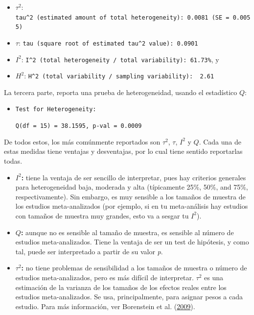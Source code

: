 \documentclass[
  bookmarksnumbered]{article}
\begin{document}
\begin{itemize}
\item
  \(\tau^2\): \texttt{tau\^{}2\ (estimated\ amount\ of\ total\ heterogeneity):\ 0.0081\ (SE\ =\ 0.0055)}
\item
  \(\tau\): \texttt{tau\ (square\ root\ of\ estimated\ tau\^{}2\ value):\ 0.0901}
\item
  \(I^2\): \texttt{I\^{}2\ (total\ heterogeneity\ /\ total\ variability):\ 61.73\%}, y
\item
  \(H^2\): \texttt{H\^{}2\ (total\ variability\ /\ sampling\ variability):\ \ 2.61}
\end{itemize}

La tercera parte, reporta una prueba de heterogeneidad, usando el estadístico \(Q\):

\begin{itemize}
\item
  \texttt{Test\ for\ Heterogeneity:}

  \texttt{Q(df\ =\ 15)\ =\ 38.1595,\ p-val\ =\ 0.0009}
\end{itemize}

De todos estos, los más comúnmente reportados son \(\tau^2\), \(\tau\), \(I^2\) y \(Q\). Cada una de estas medidas tiene ventajas y desventajas, por lo cual tiene sentido reportarlas todas.

\begin{itemize}
\item
  \textbf{\(I^2\):} tiene la ventaja de ser sencillo de interpretar, pues hay criterios generales para heterogeneidad baja, moderada y alta (típicamente 25\%, 50\%, and 75\%, respectivamente). Sin embargo, es muy sensible a los tamaños de muestra de los estudios meta-analizados (por ejemplo, si en tu meta-análisis hay estudios con tamaños de muestra muy grandes, esto va a sesgar tu \(I^2\)).
\item
  \textbf{\(Q\):} aunque no es sensible al tamaño de muestra, es sensible al número de estudios meta-analizados. Tiene la ventaja de ser un test de hipótesis, y como tal, puede ser interpretado a partir de su valor \emph{p}.
\item
  \textbf{\(\tau^2\):} no tiene problemas de sensibilidad a los tamaños de muestra o número de estudios meta-analizados, pero es más difícil de interpretar. \(\tau^2\) es una estimación de la varianza de los tamaños de los efectos reales entre los estudios meta-analizados. Se usa, principalmente, para asignar pesos a cada estudio. Para más información, ver Borenstein et al. (\protect\hyperlink{ref-borensteinIdentifyingQuantifyingHeterogeneity2009}{2009}).
\end{itemize}
\end{document}

